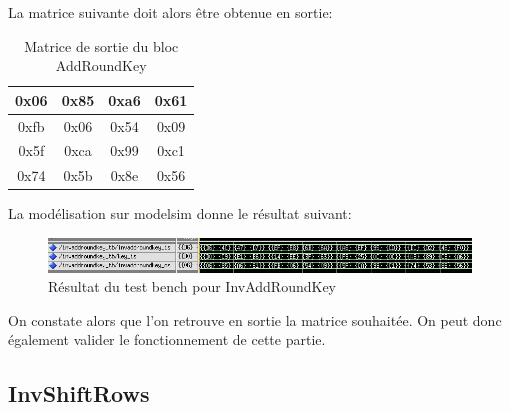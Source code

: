 \documentclass[a4paper, 12pt]{article}
\begin{document}
		La matrice suivante doit alors être obtenue en sortie: \\
			\begin{table}[H]
				\begin{center}
				\begin{tabular}{|c|c|c|c|}
					\hline
					0x06 & 0x85 & 0xa6 & 0x61 \\
					\hline
					0xfb & 0x06 & 0x54 & 0x09 \\
					\hline
					0x5f & 0xca & 0x99 & 0xc1 \\
					\hline
					0x74 & 0x5b & 0x8e & 0x56 \\
					\hline
				\end{tabular}
				\caption{Matrice de sortie du bloc AddRoundKey}
				\label{MatriceSortieInvAddRoundKey}
				\end{center}
			\end{table}
			
La modélisation sur modelsim donne le résultat suivant:
		\begin{figure}[H]
			\begin{center}
			\includegraphics[scale=0.72]{Images/InvAddRoundKeyTb.png}
			\end{center}
			\caption{Résultat du test bench pour InvAddRoundKey}
			\label{InvAddRoundKeyTb}
		\end{figure}
	On constate alors que l'on retrouve en sortie la matrice souhaitée. On peut donc également valider le fonctionnement de cette partie.
	\subsection{InvShiftRows}
\end{document}
